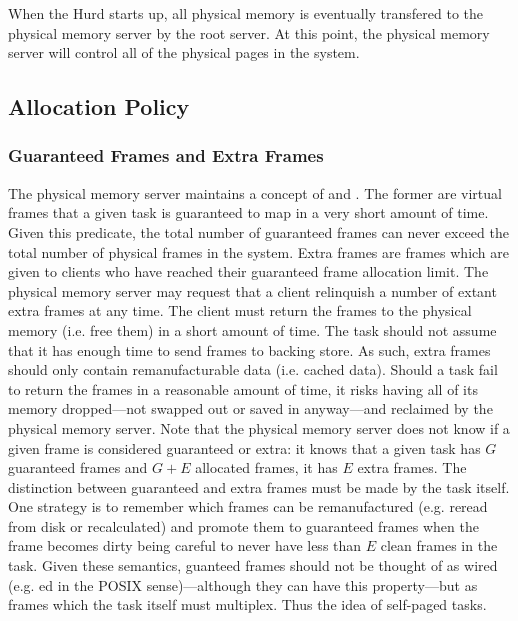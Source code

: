 When the Hurd starts up, all physical memory is eventually transfered
to the physical memory server by the root server.  At this point, the
physical memory server will control all of the physical pages in the
system.

\subsection{Allocation Policy}

\subsubsection{Guaranteed Frames and Extra Frames}

The physical memory server maintains a concept of  and .  The former are virtual frames
that a given task is guaranteed to map in a very short amount of time.
Given this predicate, the total number of guaranteed frames can never
exceed the total number of physical frames in the system.  Extra frames
are frames which are given to clients who have reached their guaranteed
frame allocation limit.  The physical memory server may request that a
client relinquish a number of extant extra frames at any time.  The
client must return the frames to the physical memory (i.e. free them)
in a short amount of time.  The task should not assume that it has
enough time to send frames to backing store.  As such, extra frames
should only contain remanufacturable data (i.e. cached data).  Should
a task fail to return the frames in a reasonable amount of time, it
risks having all of its memory dropped---not swapped out or saved in
anyway---and reclaimed by the physical memory server.  Note that the
physical memory server does not know if a given frame is considered
guaranteed or extra: it knows that a given task has $G$ guaranteed
frames and $G + E$ allocated frames, it has $E$ extra frames.  The
distinction between guaranteed and extra frames must be made by the
task itself.  One strategy is to remember which frames can be
remanufactured (e.g. reread from disk or recalculated) and promote
them to guaranteed frames when the frame becomes dirty being careful to
never have less than $E$ clean frames in the task.  Given these
semantics, guanteed frames should not be thought of as wired
(e.g. ed in the POSIX sense)---although they can have
this property---but as frames which the task itself must multiplex.
Thus the idea of self-paged tasks.


